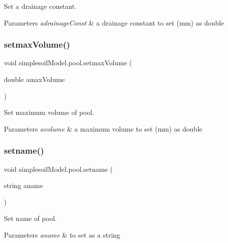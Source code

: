 Set a drainage constant. 


\begin{DoxyParams}{Parameters}
{\em adrainage\+Const} & a drainage constant to set (mm) as double \\
\hline
\end{DoxyParams}
\mbox{\label{classsimplesoil_model_1_1pool_a4afb35706d081f816ac7e0ee97a56018}} 
\subsubsection{\texorpdfstring{setmaxVolume()}{setmaxVolume()}}
{\footnotesize\ttfamily void simplesoil\+Model.\+pool.\+setmax\+Volume (\begin{DoxyParamCaption}\item[{double}]{amax\+Volume }\end{DoxyParamCaption})\hspace{0.3cm}{\ttfamily [inline]}}



Set maximum volume of pool. 


\begin{DoxyParams}{Parameters}
{\em avolume} & a maximum volume to set (mm) as double \\
\hline
\end{DoxyParams}
\mbox{\label{classsimplesoil_model_1_1pool_a52016de02c5aa32f2fb6927252619494}} 
\subsubsection{\texorpdfstring{setname()}{setname()}}
{\footnotesize\ttfamily void simplesoil\+Model.\+pool.\+setname (\begin{DoxyParamCaption}\item[{string}]{aname }\end{DoxyParamCaption})\hspace{0.3cm}{\ttfamily [inline]}}



Set name of pool. 


\begin{DoxyParams}{Parameters}
{\em aname} & to set as a string \\
\hline
\end{DoxyParams}
\mbox{\label{classsimplesoil_model_1_1pool_ac816508405bffebca3d5c475935d642f}} 

